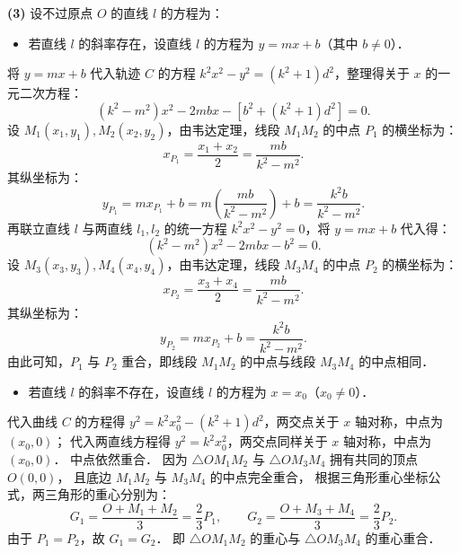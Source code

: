 \begin{answer}
\textbf{(3)}
设不过原点 $O$ 的直线 $l$ 的方程为：
\begin{itemize}
\item 若直线 $l$ 的斜率存在，设直线 $l$ 的方程为 $y = mx + b$（其中 $b \neq 0$）．
\end{itemize}
  将 $y = mx + b$ 代入轨迹 $C$ 的方程 $k^2 x^2 - y^2 = (k^2 + 1)d^2$，整理得关于 $x$ 的一元二次方程：
\nopagebreak[4]
\[(k^2 - m^2)x^2 - 2mb x - \left[b^2 + (k^2 + 1)d^2\right] = 0.\]
  设 $M_1(x_1, y_1), M_2(x_2, y_2)$，由韦达定理，线段 $M_1M_2$ 的中点 $P_1$ 的横坐标为：
\nopagebreak[4]
\[x_{P_1} = \frac{x_1 + x_2}{2} = \frac{mb}{k^2 - m^2}.\]
  其纵坐标为：
\nopagebreak[4]
\[y_{P_1} = m x_{P_1} + b = m\left(\frac{mb}{k^2 - m^2}\right) + b = \frac{k^2 b}{k^2 - m^2}.\]
  再联立直线 $l$ 与两直线 $l_1, l_2$ 的统一方程 $k^2 x^2 - y^2 = 0$，将 $y = mx + b$ 代入得：
\nopagebreak[4]
\[(k^2 - m^2)x^2 - 2mb x - b^2 = 0.\]
  设 $M_3(x_3, y_3), M_4(x_4, y_4)$，由韦达定理，线段 $M_3M_4$ 的中点 $P_2$ 的横坐标为：
\nopagebreak[4]
\[x_{P_2} = \frac{x_3 + x_4}{2} = \frac{mb}{k^2 - m^2}.\]
  其纵坐标为：
\nopagebreak[4]
\[y_{P_2} = m x_{P_2} + b = \frac{k^2 b}{k^2 - m^2}.\]
  由此可知，$P_1$ 与 $P_2$ 重合，即线段 $M_1M_2$ 的中点与线段 $M_3M_4$ 的中点相同．
\begin{itemize}
\item 若直线 $l$ 的斜率不存在，设直线 $l$ 的方程为 $x = x_0$（$x_0 \neq 0$）．
\end{itemize}
  代入曲线 $C$ 的方程得 $y^2 = k^2 x_0^2 - (k^2 + 1)d^2$，两交点关于 $x$ 轴对称，中点为 $(x_0, 0)$；
  代入两直线方程得 $y^2 = k^2 x_0^2$，两交点同样关于 $x$ 轴对称，中点为 $(x_0, 0)$．
  中点依然重合．
因为 $\triangle OM_1M_2$ 与 $\triangle OM_3M_4$ 拥有共同的顶点 $O(0, 0)$，
且底边 $M_1M_2$ 与 $M_3M_4$ 的中点完全重合，
根据三角形重心坐标公式，两三角形的重心分别为：
\nopagebreak[4]
\[
G_1 = \frac{O + M_1 + M_2}{3} = \frac{2}{3}P_1, \qquad G_2 = \frac{O + M_3 + M_4}{3} = \frac{2}{3}P_2.
\]
由于 $P_1 = P_2$，故 $G_1 = G_2$．
即 $\triangle OM_1M_2$ 的重心与 $\triangle OM_3M_4$ 的重心重合．




\end{answer}
